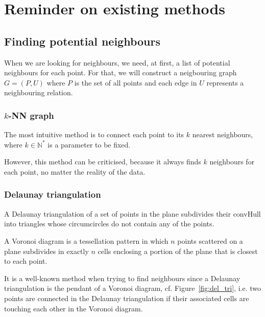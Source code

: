 \documentclass[lettersize,journal,english]{IEEEtran}
\begin{document}
\section{Reminder on existing methods\label{sec:reminder}}
    \subsection{Finding potential neighbours}
        When we are looking for neighbours, we need, at first, a list of potential neighbours for each point.
        For that, we will construct a neigbouring graph $G = (P, U)$ where $P$ is the set of all points and each edge in $U$ represents a neighbouring relation.

        \subsubsection{$k$-NN graph}
            The most intuitive method is to connect each point to its $k$ nearest neighbours, where $k \in \mathbb{N}^*$ is a parameter to be fixed. 

            However, this method can be criticised, because it always finds $k$ neighbours for each point, no matter the reality of the data.

        \subsubsection{Delaunay triangulation}
            A Delaunay triangulation \cite{art_delaunay} of a set of points in the plane subdivides their \gls{convHull} into triangles whose circumcircles do not contain any of the points.

            A Voronoi diagram is a tessellation pattern in which $n$ points scattered on a plane subdivides in exactly $n$ cells enclosing a portion of the plane that is closest to each point. 

            It is a well-known method when trying to find neighbours \cite{delaunay_neighbor} since a Delaunay triangulation is the pendant of a Voronoi diagram, cf. Figure~\ref{fig:del_tri}, i.e. two points are connected in the
            Delaunay triangulation if their associated cells are touching each other in the Voronoi diagram.
\end{document}
